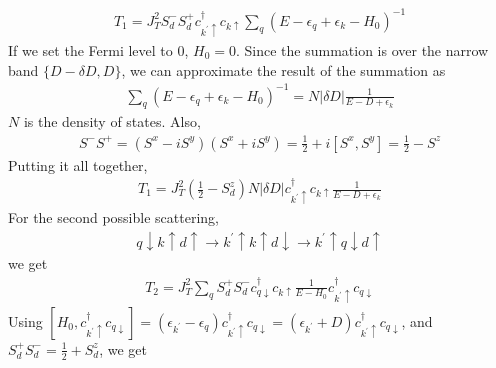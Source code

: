 \begin{equation}\begin{aligned}
	T_1 = J_T^2 S_d^- S_d^+ c^\dagger_{k^\prime \uparrow}c_{k\uparrow}\sum_q \left(E - \epsilon_q + \epsilon_k - H_0\right)^{-1}
\end{aligned}\end{equation}
If we set the Fermi level to 0, \(H_0 = 0\).
Since the summation is over the narrow band \(\{D - \delta D, D\}\), we can approximate the result of the summation as 
\begin{equation}\begin{aligned}
	\sum_q \left(E - \epsilon_q + \epsilon_k - H_0\right)^{-1} = N |\delta D | \frac{1}{E - D + \epsilon_k}
\end{aligned}\end{equation}
\(N\) is the density of states.
Also,
\begin{equation}\begin{aligned}
	S^- S^+= \left(S^x - iS^y\right)\left(S^x + iS^y\right) = \frac{1}{2} + i\left[S^x,S^y\right] = \frac{1}{2} - S^z
\end{aligned}\end{equation} 
Putting it all together, 
\begin{equation}\begin{aligned}
	T_1 = J_T^2\left(\frac{1}{2} - S_d^z\right)N|\delta D|c^\dagger_{k^\prime \uparrow}c_{k\uparrow}\frac{1}{E - D + \epsilon_k}
\end{aligned}\end{equation}
For the second possible scattering,
\begin{equation}\begin{aligned}
q \downarrow k \uparrow d\uparrow \rightarrow k^\prime \uparrow k \uparrow d\downarrow \rightarrow k^\prime\uparrow q \downarrow d\uparrow
\end{aligned}\end{equation}
we get
\begin{equation}\begin{aligned}
T_2 = J_T^2\sum_q S_d^+S_d^- c^\dagger_{q\downarrow}c_{k\uparrow}\frac{1}{E - H_0}c^\dagger_{k^\prime \uparrow}c_{q\downarrow}
\end{aligned}\end{equation}
Using \(\left[H_0, c^\dagger_{k^\prime \uparrow}c_{q\downarrow}\right] = \left(\epsilon_{k^\prime} - \epsilon_q\right) c^\dagger_{k^\prime \uparrow}c_{q\downarrow}= \left(\epsilon_{k^\prime} +D\right) c^\dagger_{k^\prime \uparrow}c_{q\downarrow}\), and \(S_d^+ S_d^- = \frac{1}{2}+S_d^z\), we get
